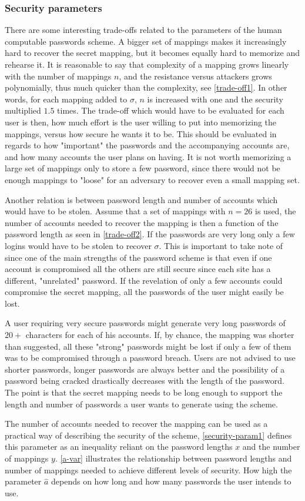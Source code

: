 \subsubsection{Security parameters} \label{sec-params}
\par There are some interesting trade-offs related to the parameters of the human computable passwords scheme. A bigger set of mappings makes it increasingly hard to recover the secret mapping, but it becomes equally hard to memorize and rehearse it. It is reasonable to say that complexity of a mapping grows linearly with the number of mappings $n$, and the resistance versus attackers grows polynomially, thus much quicker than the complexity, see \autoref{trade-off1}. In other words, for each mapping added to $\sigma$, $n$ is increased with one and the security multiplied $1.5$ times. The trade-off which would have to be evaluated for each user is then, how much effort is the user willing to put into memorizing the mappings, versus how secure he wants it to be. This should be evaluated in regards to how "important" the passwords and the accompanying accounts are, and how many accounts the user plans on having. It is not worth memorizing a large set of mappings only to store a few password, since there would not be enough mappings to "loose" for an adversary to recover even a small mapping set.
\par Another relation is between password length and number of accounts which would have to be stolen. Assume that a set of mappings with $n=26$ is used, the number of accounts needed to recover the mapping is then a function of the password length as seen in \autoref{trade-off2}. If the passwords are very long only a few logins would have to be stolen to recover $\sigma$. This is important to take note of since one of the main strengths of the password scheme is that even if one account is compromised all the others are still secure since each site has a different, "unrelated" password. If the revelation of only a few accounts could compromise the secret mapping, all the passwords of the user might easily be lost.
\par A user requiring very secure passwords might generate very long passwords of $20+$ characters for each of his accounts. If, by chance, the mapping was shorter than suggested, all these "strong" passwords might be lost if only a few of them was to be compromised through a password breach. Users are not advised to use shorter passwords, longer passwords are always better and the possibility of a password being cracked drastically decreases with the length of the password. The point is that the secret mapping needs to be long enough to support the length and number of passwords a user wants to generate using the scheme.
\par The number of accounts needed to recover the mapping can be used as a practical way of describing the security of the scheme, \autoref{security-param1} defines this parameter as an inequality reliant on the password lengths $x$ and the number of mappings $y$. \autoref{a-var} illustrates the relationship between password lengths and number of mappings needed to achieve different levels of security. How high the parameter $\hat a$ depends on how long and how many passwords the user intends to use. 


